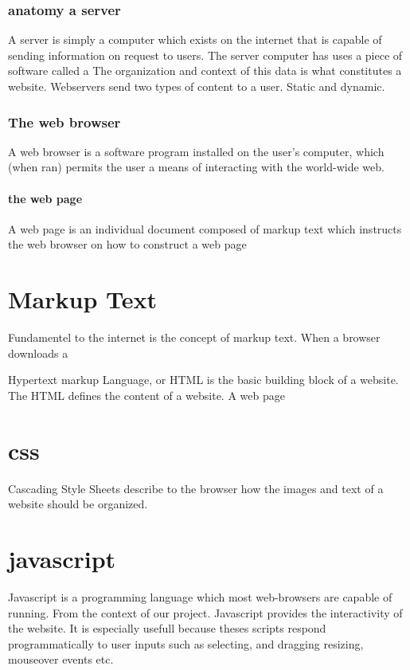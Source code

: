 \subsection{anatomy a server}

A server is simply a computer which exists on the internet that is capable of sending information on request to users.  The server computer has uses a piece of software called a   The organization and context of this data is what constitutes a website.  Webservers send two types of content to a user.  Static and dynamic.

\subsection{The web browser}

A web browser is a software program installed on the user's computer, which (when ran) permits the user a means of interacting with the world-wide web.  


\subsubsection{the web page}

A web page is an individual document composed of markup text which instructs the web browser on how to construct a web page

\chapter{Markup Text}

Fundamentel to the internet is the concept of markup text.  When a browser downloads a 

Hypertext markup Language, or HTML is the basic building block of a website.  The HTML defines the content of a website.  A web page 

\chapter{css}

Cascading Style Sheets describe to the browser how the images and text of a website should be organized.  

\chapter{javascript}

Javascript is a programming language which most web-browsers are capable of running.  From the context of our project.  Javascript provides the interactivity of the website.  It is especially usefull because theses scripts respond programmatically to user inputs such as selecting, and dragging resizing, mouseover events etc.

